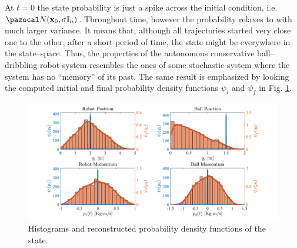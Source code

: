 %
At $t=0$ the state probability is just a spike across the initial condition, i.e. $\N(\xb_0,\sigma\mathbb{I}_n)$. Throughout time, however the probability relaxes to with much larger variance. It means that, although all trajectories started very close one to the other, after a short period of time, the state might be everywhere in the state--space. Thus, the properties of the autonomous conservative ball--dribbling robot system resembles the ones of some stochastic system where the system has no ``memory'' of its past.
The same result is emphasized by looking the computed initial and final probability density functions $\psi_i$ and $\psi_f$ in Fig. \ref{fig:hist}.
%
\begin{figure}[h]
    \centering
    \includegraphics[width = 1\linewidth]{Figures/Hist.pdf}
    \caption{Histograms and reconstructed probability density functions of the state.}
    \label{fig:hist}
\end{figure}
%
\clearpage
